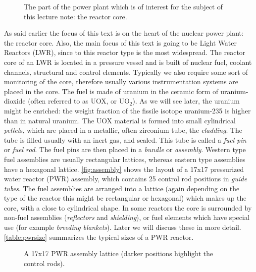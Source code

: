 \begin{figure}[ht!]
\protect {}\protect
\caption{\label{fig:reactorcore} \footnotesize{The part of the power plant which is of interest for the subject of this lecture note: the reactor core.}}
\end{figure}

As said earlier the focus of this text is on the heart of the nuclear power plant: the reactor core. Also, the main focus of this text is going to be Light Water Reactors (LWR), since to this reactor type is the most widespread. The reactor core of an LWR is located in a pressure vessel and is built of nuclear fuel, coolant channels, structural and control elements. Typically we also require some sort of monitoring of the core, therefore usually various instrumentation systems are placed in the core. The fuel is made of uranium in the ceramic form of uranium-dioxide (often referred to as UOX, or UO$_2$). As we will see later, the uranium might be enriched: the weight fraction of the fissile isotope uranium-235 is higher than in natural uranium. The UOX material is formed into small cylindrical \textit{pellet}s, which are placed in a metallic, often zirconium tube, the \textit{cladding}. The tube is filled usually with an inert gas, and sealed. This tube is called a \textit{fuel pin} or \textit{fuel rod}. The fuel pins are then placed in a \textit{bundle} or \textit{assembly}. Western type fuel assemblies are usually rectangular lattices, whereas eastern type assemblies have a hexagonal lattice. \autoref{fig:assembly} shows the layout of a 17x17 pressurized water reactor (PWR) assembly, which contains 25 control rod positions in \textit{guide tubes}. The fuel assemblies are arranged into a lattice (again depending on the type of the reactor this might be rectangular or hexagonal) which makes up the core, with a close to cylindrical shape. In some reactors the core is surrounded by non-fuel assemblies (\textit{reflectors} and \textit{shielding}), or fuel elements which have special use (for example \textit{breeding blankets}). Later we will discuss these in more detail. \autoref{table:pwrsize} summarizes the typical sizes of a PWR reactor. 

\begin{figure}[ht!]
\protect {}\protect
\caption{\label{fig:assembly} \footnotesize{A 17x17 PWR assembly lattice (darker positions highlight the control rods).}}
\end{figure}

